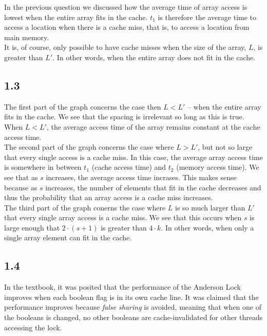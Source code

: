 \documentclass[11pt, letterpaper]{article}
\begin{document}
In the previous question we discussed how the average time of array access is lowest when the entire array fits in the cache. $t_1$ is therefore the average time to access a location when there is a cache miss, that is, to access a location from main memory.\\

It is, of course, only possible to have cache misses when the size of the array, $L$, is greater than $L'$. In other words, when the entire array does not fit in the cache.

\subsection*{1.3}
\label{sub:1_3}

The first part of the graph concerns the case then $L < L'$ -- when the entire array fits in the cache. We see that the spacing is irrelevant so long as this is true. When $L < L'$, the average access time of the array remains constant at the cache access time.\\

The second part of the graph concerns the case where $L > L'$, but not so large that every single access is a cache miss. In this case, the average array access time is somewhere in between $t_1$ (cache access time) and $t_2$ (memory access time). We see that as $s$ increases, the average access time incrases. This makes sense because as $s$ increases, the number of elements that fit in the cache decreases and thus the probability that an array access is a cache miss increases.\\

The third part of the graph conerns the case where $L$ is so much larger than $L'$ that every single array access is a cache miss. We see that this occurs when $s$ is large enough that $2 \cdot (s+1)$ is greater than $4 \cdot k$. In other words, when only a single array element can fit in the cache.

\subsection*{1.4}
\label{sub:1_4}

In the textbook, it was posited that the performance of the Anderson Lock improves when each boolean flag is in its own cache line. It was claimed that the performance improves because \textit{false sharing} is avoided, meaning that when one of the booleans is changed, no other booleans are cache-invalidated for other threads accessing the lock.\\
\end{document}
